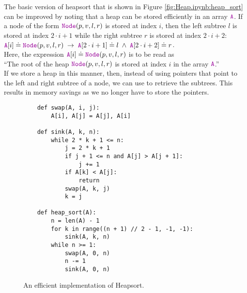 The basic version of heapsort that is shown in Figure \ref{fig:Heap.ipynb:heap_sort} can be improved
by noting that a heap can be stored efficiently in an array $\mytt{A}$.  If a node of the form
$\mytt{Node}(p, v, l, r)$ is stored at index $i$, then the left subtree $l$ is stored at
index $2 \cdot i + 1$ while the right subtree $r$ is stored at index $2 \cdot i + 2$:
\\[0.2cm]
\hspace*{1.3cm}
$\mytt{A}[i] \doteq \mytt{Node}(p, v, l, r) \;\rightarrow\; \mytt{A}[2\cdot i + 1] \doteq l \;\wedge\; \mytt{A}[2\cdot i+2] \doteq r$.
\\[0.2cm]
Here, the expression $\mytt{A}[i] \doteq \mytt{Node}(p, v, l, r)$ is to be read as 
\\[0.2cm]
\hspace*{1.3cm}
``The root of the heap $\mytt{Node}(p, v, l, r)$ is stored at index $i$ in the array $\mytt{A}$.''
\\[0.2cm]
If we store a heap in this manner, then, instead of using pointers that point to the left and right
subtree of a node, we can use  to retrieve the subtrees.  This results in memory savings as we
no longer have to store the pointers.


\begin{figure}[!ht]
\centering
\begin{verbatim}
    def swap(A, i, j):
        A[i], A[j] = A[j], A[i]
    
    def sink(A, k, n):
        while 2 * k + 1 <= n:
            j = 2 * k + 1
            if j + 1 <= n and A[j] > A[j + 1]:
                j += 1
            if A[k] < A[j]:
                return
            swap(A, k, j)
            k = j
    
    def heap_sort(A):
        n = len(A) - 1
        for k in range((n + 1) // 2 - 1, -1, -1):
            sink(A, k, n)
        while n >= 1:
            swap(A, 0, n)
            n -= 1
            sink(A, 0, n)
\end{verbatim}
\vspace*{-0.3cm}
\caption{An efficient implementation of Heapsort.}
\label{fig:Heapsort.ipynb}
\end{figure}



